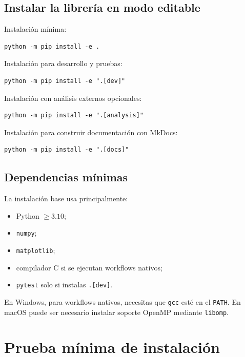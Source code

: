 \documentclass[11pt,letterpaper]{article}
\begin{document}
\subsection{Instalar la librería en modo editable}

Instalación mínima:

\begin{lstlisting}[style=terminal]
python -m pip install -e .
\end{lstlisting}

Instalación para desarrollo y pruebas:

\begin{lstlisting}[style=terminal]
python -m pip install -e ".[dev]"
\end{lstlisting}

Instalación con análisis externos opcionales:

\begin{lstlisting}[style=terminal]
python -m pip install -e ".[analysis]"
\end{lstlisting}

Instalación para construir documentación con MkDocs:

\begin{lstlisting}[style=terminal]
python -m pip install -e ".[docs]"
\end{lstlisting}

\subsection{Dependencias mínimas}

La instalación base usa principalmente:

\begin{itemize}
  \item Python $\geq 3.10$;
  \item \texttt{numpy};
  \item \texttt{matplotlib};
  \item compilador C si se ejecutan workflows nativos;
  \item \texttt{pytest} solo si instalas \texttt{.[dev]}.
\end{itemize}

En Windows, para workflows nativos, necesitas que \texttt{gcc} esté en el \texttt{PATH}. En macOS puede ser necesario instalar soporte OpenMP mediante \texttt{libomp}.

\section{Prueba mínima de instalación}
\end{document}
